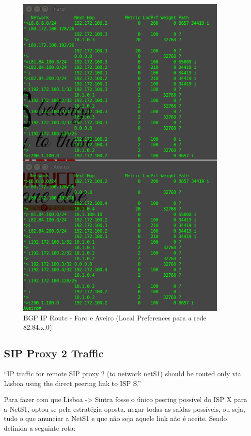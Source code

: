 \documentclass[11pt,a4paper]{report}
\begin{document}
\begin{figure}[H]
\centerline{\includegraphics[width=300pt]{Selection_001.png}}
\caption{BGP IP Route - Faro e Aveiro (Local Preferences para a rede 82.84.x.0)}
\label{schema}
\end{figure}

\subsection{SIP Proxy 2 Traffic}

``IP traffic for remote SIP proxy 2 (to network netS1) should be routed only via Lisboa using the direct peering link to ISP S.''
\newline

Para fazer com que Lisboa -> Sintra fosse o único peering possível do ISP X para a NetS1, optou-se pela estratégia oposta, negar todas as saídas possíveis, ou seja, tudo o que anunciar a NetS1 e que não seja aquele link não é aceite. Sendo definida a seguinte rota:\\
\end{document}
